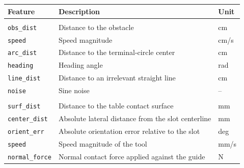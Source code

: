 \documentclass[lettersize,journal]{IEEEtran}
\newcommand{\NoAct}{--}
\begin{document}


\begin{table}[t]
\centering
\footnotesize
\setlength{\tabcolsep}{3pt}
\renewcommand{\arraystretch}{1.05}

\begin{tabularx}{\columnwidth}{
@{}
>{\raggedright\arraybackslash}p{2.05cm}
>{\raggedright\arraybackslash}X
>{\centering\arraybackslash}p{0.75cm}
@{}
}
\toprule
Feature & Description & Unit \\
\midrule

\multicolumn{3}{@{}l}{\textbf{\texttt{S3ObsAvoid}}} \\
\addlinespace[0.1em]
\texttt{obs\_dist}
& Distance to the obstacle
& cm \\

\texttt{speed}
& Speed magnitude
& cm/s \\

\texttt{arc\_dist}
& Distance to the terminal-circle center
& cm \\

\texttt{heading}
& Heading angle
& rad \\

\texttt{line\_dist}
& Distance to an irrelevant straight line
& cm \\

\texttt{noise}
& Sine noise
& -- \\

\addlinespace[0.25em]
\midrule
\addlinespace[0.1em]

\multicolumn{3}{@{}l}{\textbf{\texttt{S4SlideInsert}}} \\
\addlinespace[0.1em]
\texttt{surf\_dist}
& Distance to the table contact surface
& mm \\

\texttt{center\_dist}
& Absolute lateral distance from the slot centerline
& mm \\

\texttt{orient\_err}
& Absolute orientation error relative to the slot
& deg \\

\texttt{speed}
& Speed magnitude of the tool
& mm/s \\

\texttt{normal\_force}
& Normal contact force applied against the guide
& N \\


\end{tabularx}
\end{table}
\end{document}
